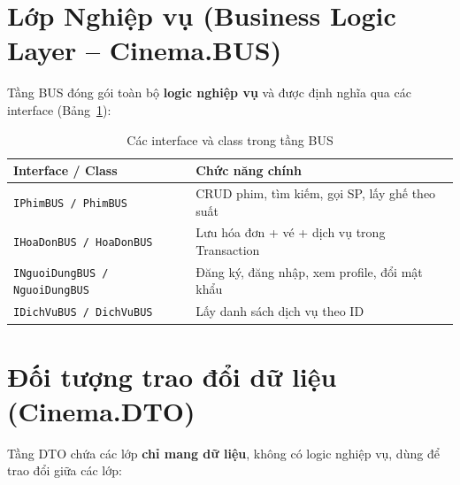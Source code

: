 \documentclass[12pt,a4paper,oneside]{book}
\theoremstyle{plain}
\numberwithin{equation}{chapter}
\begin{document}
\section{Lớp Nghiệp vụ (Business Logic Layer -- Cinema.BUS)}\label{Sec3.2}

\noindent Tầng BUS đóng gói toàn bộ \textbf{logic nghiệp vụ} và được định nghĩa qua các interface (Bảng~\ref{table_bus}):

\begin{table}[H]
    \begin{center}
        \begin{tabular}{|l|l|}
            \hline
            \textbf{Interface / Class} & \textbf{Chức năng chính} \\
            \hline
            \texttt{IPhimBUS / PhimBUS}           & CRUD phim, tìm kiếm, gọi SP, lấy ghế theo suất \\
            \hline
            \texttt{IHoaDonBUS / HoaDonBUS}       & Lưu hóa đơn + vé + dịch vụ trong Transaction \\
            \hline
            \texttt{INguoiDungBUS / NguoiDungBUS} & Đăng ký, đăng nhập, xem profile, đổi mật khẩu \\
            \hline
            \texttt{IDichVuBUS / DichVuBUS}       & Lấy danh sách dịch vụ theo ID \\
            \hline
        \end{tabular}
    \end{center}
    \caption{Các interface và class trong tầng BUS}\label{table_bus}
\end{table}

\section{Đối tượng trao đổi dữ liệu (Cinema.DTO)}\label{Sec3.3}

\noindent Tầng DTO chứa các lớp \textbf{chỉ mang dữ liệu}, không có logic nghiệp vụ, dùng để trao đổi giữa các lớp:
\end{document}
